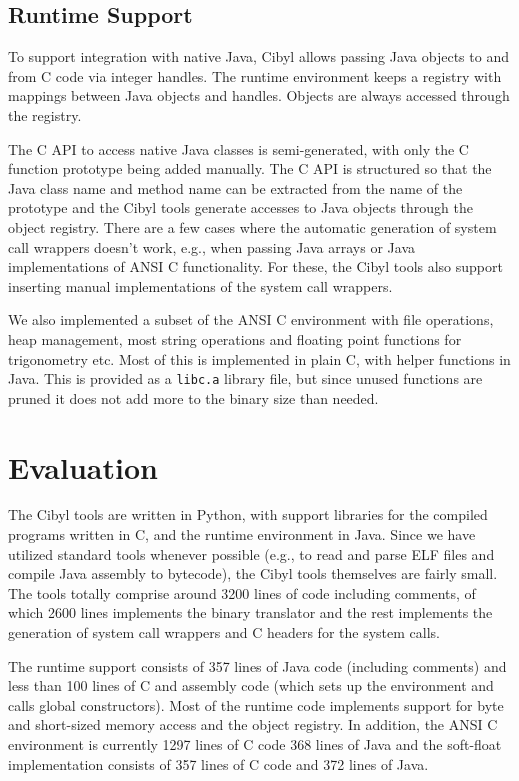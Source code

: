 \subsection{Runtime Support}
To support integration with native Java, Cibyl allows passing Java objects to
and from C code via integer handles. The runtime environment keeps a registry
with mappings between Java objects and handles. Objects are always accessed
through the registry.

The C API to access native Java classes is semi-generated, with only the C
function prototype being added manually. The C API is structured so that the
Java class name and method name can be extracted from the name of the
prototype and the Cibyl tools generate accesses to Java objects through the
object registry. There are a few cases where the automatic generation of
system call wrappers doesn't work, e.g., when passing Java arrays or Java
implementations of ANSI C functionality. For these, the Cibyl tools also
support inserting manual implementations of the system call wrappers.

We also implemented a subset of the ANSI C environment with file operations,
heap management, most string operations and floating point functions for
trigonometry etc. Most of this is implemented in plain C, with helper
functions in Java. This is provided as a \texttt{libc.a} library file, but
since unused functions are pruned it does not add more to the binary size than
needed.

\section{Evaluation}
\label{sec:cibyl:evaluation}
The Cibyl tools are written in Python, with support libraries for the compiled
programs written in C, and the runtime environment in Java. Since we have
utilized standard tools whenever possible (e.g., to read and parse ELF files
and compile Java assembly to bytecode), the Cibyl tools themselves are fairly
small. The tools totally comprise around 3200 lines of code including
comments, of which 2600 lines implements the binary translator and the rest
implements the generation of system call wrappers and C headers for the system
calls.

The runtime support consists of 357 lines of Java code (including comments)
and less than 100 lines of C and assembly code (which sets up the environment
and calls global constructors). Most of the runtime code implements support
for byte and short-sized memory access and the object registry. In addition,
the ANSI C environment is currently 1297 lines of C code 368 lines of Java and
the soft-float implementation consists of 357 lines of C code and 372 lines of
Java.

